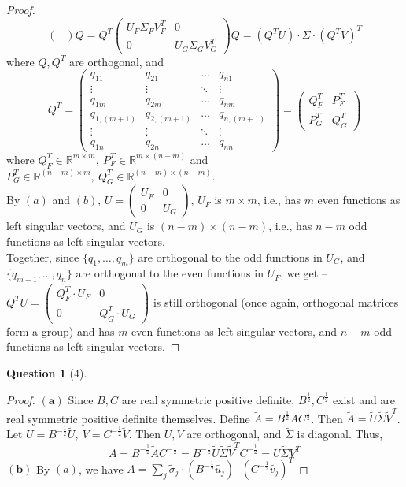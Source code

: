 \documentclass[11pt]{article}
\theoremstyle{quest}
\newtheorem*{question}{Question}
\begin{document}
\begin{proof}
$$\begin{pmatrix}
\end{pmatrix} Q = Q^T \begin{pmatrix}
U_F \Sigma_F V_F^T & 0 \\
0 & U_G \Sigma_G V_G^T
\end{pmatrix} Q = (Q^TU) \cdot \Sigma \cdot (Q^TV)^T$$
where $Q, Q^T$ are orthogonal, and
$$Q^T = \begin{pmatrix}
q_{11} & q_{21} & \ldots & q_{n1}\\
\vdots & \vdots & \ddots & \vdots \\
q_{1m} & q_{2m} & \ldots & q_{nm} \\
q_{1,(m+1)} & q_{2,(m+1)} & \ldots & q_{n,(m+1)} \\
\vdots & \vdots & \ddots & \vdots \\
q_{1n} & q_{2n} & \ldots & q_{nn}
\end{pmatrix} = \begin{pmatrix}
Q_F^T & P_F^T \\
P_G^T & Q_G^T
\end{pmatrix}$$
where $Q_F^T \in \mathbb{R}^{m \times m},\ P_F^T \in \mathbb{R}^{m \times (n-m)}$ and $P_G^T \in \mathbb{R}^{(n-m) \times m},\ Q_G^T \in \mathbb{R}^{(n-m) \times (n-m)}$.
\\By $(a)$ and $(b)$, $U = \begin{pmatrix}
U_F & 0 \\
0 & U_G
\end{pmatrix}$, $U_F$ is $m \times m$, i.e., has $m$ even functions as left singular vectors, and $U_G$ is $(n-m) \times (n-m)$, i.e., has $n-m$ odd functions as left singular vectors.
\\Together, since $\{q_1, \ldots, q_m\}$ are orthogonal to the odd functions in $U_G$, and $\{q_{m+1}, \ldots, q_n\}$ are orthogonal to the even functions in $U_F$, we get -- 
\\$Q^TU = \begin{pmatrix}
Q_F^T \cdot U_F & 0 \\
0 & Q_G^T \cdot U_G
\end{pmatrix}$ is still orthogonal (once again, orthogonal matrices form a group) and has $m$ even functions as left singular vectors, and $n-m$ odd functions as left singular vectors.
\end{proof}

\begin{question}[4]
\end{question}
\begin{proof}
$\mathbf{(a)}$ Since $B, C$ are real symmetric positive definite, $B^{\frac{1}{2}}, C^{\frac{1}{2}}$ exist and are real symmetric positive definite themselves. Define $\tilde{A} = B^{\frac{1}{2}} A C^{\frac{1}{2}}$. Then $\tilde{A} = \tilde{U}  \tilde{\Sigma} \tilde{V}^T$. Let $U = B^{-\frac{1}{2}} \tilde{U},\ V = C^{-\frac{1}{2}} \tilde{V}$. Then $U, V$ are orthogonal, and $\tilde{\Sigma}$ is diagonal. Thus,
$$A = B^{-\frac{1}{2}} \tilde{A} C^{-\frac{1}{2}} = B^{-\frac{1}{2}} \tilde{U}  \tilde{\Sigma} \tilde{V}^T C^{-\frac{1}{2}} = U \tilde{\Sigma} V^T$$
$\mathbf{(b)}$ By $(a)$, we have $A = \sum_j \tilde{\sigma}_j \cdot (B^{-\frac{1}{2}} \tilde{u_j}) \cdot (C^{-\frac{1}{2}} \tilde{v_j})^T$
\end{proof}
\end{document}
